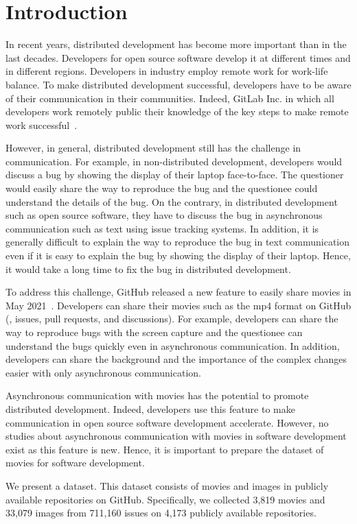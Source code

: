 \section{Introduction}
\label{sec:intro}
In recent years, distributed development has become 
more important than in the last decades. 
Developers for open source software develop it 
at different times and in different regions. 
Developers in industry employ remote work for work-life balance. 
To make distributed development successful, 
developers have to be aware of their communication 
in their communities. 
Indeed, GitLab Inc. in which all developers work remotely 
public their knowledge of the key steps 
to make remote work successful~\citep{gitlab2020remoteplaybook}. 


However, in general, distributed development still has 
the challenge in communication. 
For example, in non-distributed development, 
developers would discuss a bug by showing the display of 
their laptop face-to-face. 
The questioner would easily share the way to reproduce the bug 
and the questionee could understand the details of the bug. 
On the contrary, in distributed development such as 
open source software, they have to discuss the bug 
in asynchronous communication 
such as text using issue tracking systems. 
In addition, it is generally difficult to explain the way 
to reproduce the bug in text communication 
even if it is easy to explain the bug by showing 
the display of their laptop. 
Hence, it would take a long time to fix the bug 
in distributed development. 


To address this challenge, GitHub released a new feature 
to easily share movies in May 2021~\citep{github-video-blog}. 
Developers can share their movies such as the mp4 format 
on GitHub (\eg,  issues, pull requests, and discussions). 
For example, developers can share the way to reproduce bugs 
with the screen capture and the questionee can understand 
the bugs quickly even in asynchronous communication. 
In addition, developers can share the background and 
the importance of the complex changes easier with 
only asynchronous communication. 


Asynchronous communication with movies has the potential 
to promote distributed development. 
Indeed, developers use this feature to make communication 
in open source software development accelerate. 
However, no studies about asynchronous communication with 
movies in software development exist 
as this feature is new. 
Hence, it is important to prepare the dataset of movies
for software development. 


We present a dataset. 
This dataset consists of movies and images 
in publicly available repositories on GitHub. 
Specifically, we collected 
3,819 movies and 
33,079 images from 
711,160 issues on
4,173 publicly available repositories.
